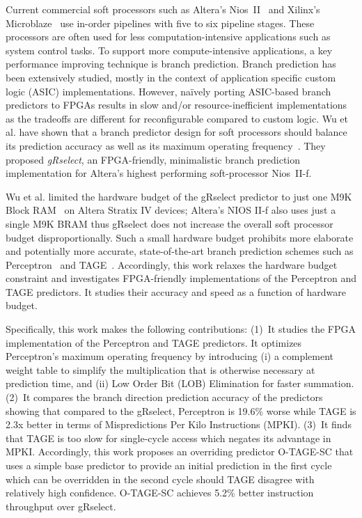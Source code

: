 \documentclass[conference]{IEEEtran}
\begin{document}
Current commercial soft processors such as Altera's Nios~II~\cite{niosii} and Xilinx's Microblaze~\cite{microblaze} use in-order pipelines with five to six pipeline stages. These processors are often used for less computation-intensive applications such as system control tasks. To support more compute-intensive applications, a key performance improving technique is branch prediction. Branch prediction has been extensively studied, mostly in the context of application specific custom logic (ASIC) implementations. However, na\"ively porting ASIC-based branch predictors to FPGAs results in slow and/or resource-inefficient implementations as the tradeoffs are different for reconfigurable compared to custom logic. Wu et al. have shown that a branch predictor design for soft processors should balance its prediction accuracy as well as its maximum operating frequency~\cite{grselect}. They proposed \textit{gRselect}, an FPGA-friendly, minimalistic branch prediction implementation for Altera's highest performing soft-processor Nios~II-f.

Wu et al. limited the hardware budget of the gRselect predictor to just one M9K Block RAM~\cite{StratixIVM9K} on Altera Stratix IV devices; Altera's NIOS II-f also uses just a single M9K BRAM thus gRselect does not increase the overall soft processor budget disproportionally. Such a small hardware budget prohibits more elaborate and potentially more accurate, state-of-the-art branch prediction schemes such as Perceptron~\cite{perceptron} and TAGE~\cite{tage}. Accordingly, this work relaxes the hardware budget constraint and investigates FPGA-friendly implementations of the Perceptron and TAGE predictors. It studies their accuracy and speed as a function of hardware budget.  

Specifically, this work makes the following contributions: (1)~It studies the FPGA implementation of the Perceptron and TAGE predictors. It optimizes Perceptron's maximum operating frequency by introducing (i) a complement weight table to simplify the multiplication that is otherwise necessary at  prediction time, and (ii) Low Order Bit (LOB) Elimination for faster summation. (2)~It compares the branch direction prediction accuracy of the predictors showing that compared to the gRselect, Perceptron is 19.6\% worse while TAGE is 2.3x better in terms of Mispredictions Per Kilo Instructions (MPKI). (3)~It finds that TAGE is too slow for single-cycle access which negates its advantage in MPKI. Accordingly, this work proposes an overriding predictor \mbox{O-TAGE-SC} that uses a simple base predictor to provide an initial prediction in the first cycle which can be overridden in the second cycle should TAGE disagree with relatively high confidence. \mbox{O-TAGE-SC} achieves 5.2\% better instruction throughput over gRselect.
\end{document}

